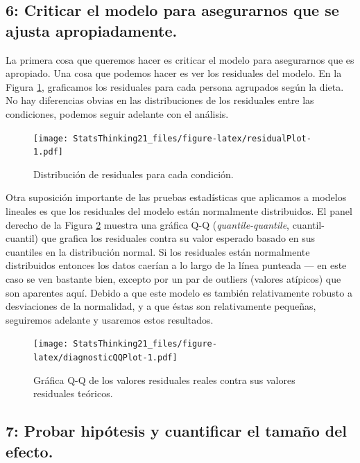 \documentclass[
  12pt,
]{book}
\begin{document}
\hypertarget{criticar-el-modelo-para-asegurarnos-que-se-ajusta-apropiadamente.}{%
\subsection{6: Criticar el modelo para asegurarnos que se ajusta apropiadamente.}\label{criticar-el-modelo-para-asegurarnos-que-se-ajusta-apropiadamente.}}

La primera cosa que queremos hacer es criticar el modelo para asegurarnos que es apropiado. Una cosa que podemos hacer es ver los residuales del modelo. En la Figura \ref{fig:residualPlot}, graficamos los residuales para cada persona agrupados según la dieta. No hay diferencias obvias en las distribuciones de los residuales entre las condiciones, podemos seguir adelante con el análisis.

\begin{figure}
\centering
\texttt{[image: StatsThinking21\_files/figure-latex/residualPlot-1.pdf]}
\caption{\label{fig:residualPlot}Distribución de residuales para cada condición.}
\end{figure}

Otra suposición importante de las pruebas estadísticas que aplicamos a modelos lineales es que los residuales del modelo están normalmente distribuidos. El panel derecho de la Figura \ref{fig:diagnosticQQPlot} muestra una gráfica Q-Q (\emph{quantile-quantile}, cuantil-cuantil) que grafica los residuales contra su valor esperado basado en sus cuantiles en la distribución normal. Si los residuales están normalmente distribuidos entonces los datos caerían a lo largo de la línea punteada --- en este caso se ven bastante bien, excepto por un par de outliers (valores atípicos) que son aparentes aquí. Debido a que este modelo es también relativamente robusto a desviaciones de la normalidad, y a que éstas son relativamente pequeñas, seguiremos adelante y usaremos estos resultados.

\begin{figure}
\centering
\texttt{[image: StatsThinking21\_files/figure-latex/diagnosticQQPlot-1.pdf]}
\caption{\label{fig:diagnosticQQPlot}Gráfica Q-Q de los valores residuales reales contra sus valores residuales teóricos.}
\end{figure}

\hypertarget{probar-hipuxf3tesis-y-cuantificar-el-tamauxf1o-del-efecto.}{%
\subsection{7: Probar hipótesis y cuantificar el tamaño del efecto.}\label{probar-hipuxf3tesis-y-cuantificar-el-tamauxf1o-del-efecto.}}
\end{document}
